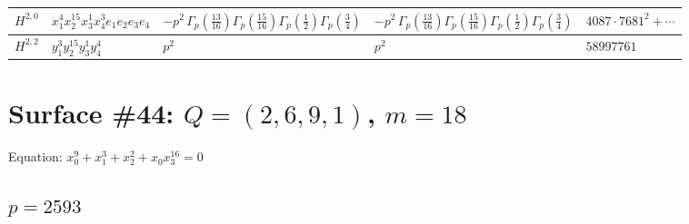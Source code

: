 \documentclass[11pt]{article}
\begin{document}
\begin{table}[ht]
{\begin{tabular}{@{}lllll@{}}
\midrule
$H^{2,0}$ & $x_{1}^{4} x_{2}^{15} x_{3}^{1} x_{4}^{3}  e_{1} e_{2} e_{3} e_{4}$ & $- p^{2} \, \Gamma_p \left( \frac{13}{16} \right) \Gamma_p \left( \frac{15}{16} \right) \Gamma_p \left( \frac{1}{2} \right) \Gamma_p \left( \frac{3}{4} \right)$ & $- p^{2} \, \Gamma_p \left( \frac{13}{16} \right) \Gamma_p \left( \frac{15}{16} \right) \Gamma_p \left( \frac{1}{2} \right) \Gamma_p \left( \frac{3}{4} \right)$ & $4087{\cdot}7681^{2}{+}\cdots$ \\
\midrule
$H^{2,2}$ & $y_{1}^{3} y_{2}^{15} y_{3}^{1} y_{4}^{4}$ & $p^{2} \,$ & $p^{2} \,$ & $58997761$ \\
\bottomrule
\end{tabular}
}
\renewcommand{\arraystretch}{1.0}
\end{table}

\newpage

\section*{Surface \#44: $Q=(2, 6, 9, 1)$, $m=18$}

Equation: $x_0^{9} + x_1^{3} + x_2^{2} + x_0 x_3^{16} = 0$

\subsection*{$p = 2593$}
\end{document}
